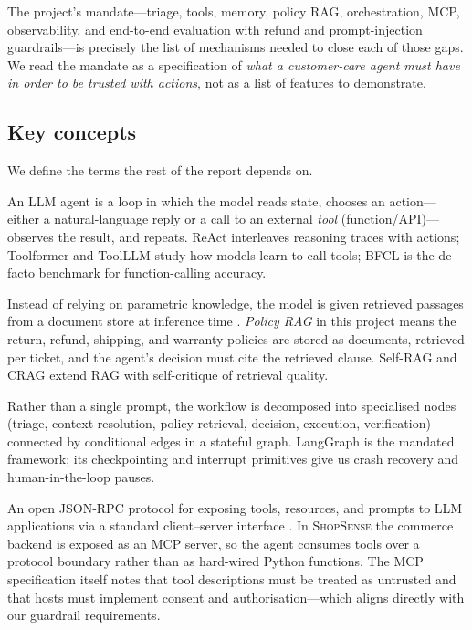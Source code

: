 \documentclass[11pt,a4paper]{article}
\newcommand{\shopsense}{\textsc{ShopSense}}
\begin{document}
The project's mandate---triage, tools, memory, policy RAG, orchestration, MCP, observability, and end-to-end evaluation with refund and prompt-injection guardrails---is precisely the list of mechanisms needed to close each of those gaps. We read the mandate as a specification of \emph{what a customer-care agent must have in order to be trusted with actions}, not as a list of features to demonstrate.

\subsection{Key concepts}

We define the terms the rest of the report depends on.

\begin{description}[style=nextline]
  \item[LLM agent and tool use.] An LLM agent is a loop in which the model reads state, chooses an action---either a natural-language reply or a call to an external \emph{tool} (function/API)---observes the result, and repeats. ReAct \citep{yao2022react} interleaves reasoning traces with actions; Toolformer \citep{schick2023toolformer} and ToolLLM \citep{qin2023toolllm} study how models learn to call tools; BFCL \citep{patil2025bfcl} is the de facto benchmark for function-calling accuracy.
  \item[Retrieval-augmented generation (RAG).] Instead of relying on parametric knowledge, the model is given retrieved passages from a document store at inference time \citep{lewis2020rag}. \emph{Policy RAG} in this project means the return, refund, shipping, and warranty policies are stored as documents, retrieved per ticket, and the agent's decision must cite the retrieved clause. Self-RAG \citep{asai2023selfrag} and CRAG \citep{yan2024crag} extend RAG with self-critique of retrieval quality.
  \item[Multi-agent orchestration and LangGraph.] Rather than a single prompt, the workflow is decomposed into specialised nodes (triage, context resolution, policy retrieval, decision, execution, verification) connected by conditional edges in a stateful graph. LangGraph \citep{langgraph2026docs} is the mandated framework; its checkpointing and interrupt primitives give us crash recovery and human-in-the-loop pauses.
  \item[Model Context Protocol (MCP).] An open JSON-RPC protocol for exposing tools, resources, and prompts to LLM applications via a standard client--server interface \citep{mcp2026spec}. In \shopsense{} the commerce backend is exposed as an MCP server, so the agent consumes tools over a protocol boundary rather than as hard-wired Python functions. The MCP specification itself notes that tool descriptions must be treated as untrusted and that hosts must implement consent and authorisation---which aligns directly with our guardrail requirements.

\end{description}
\end{document}
